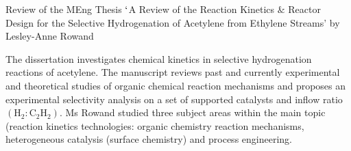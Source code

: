 \documentclass[14pt,twoside]{report}
\begin{document}
\clearpage





\bigskip

\begin{center}
  {\Large Review of the MEng Thesis $\lq$A Review of the Reaction Kinetics $\&$ Reactor Design for the Selective Hydrogenation of Acetylene from Ethylene Streams' by Lesley-Anne Rowand}
\end{center}

\medskip

The dissertation investigates chemical kinetics in selective hydrogenation reactions of acetylene. The manuscript reviews past and currently experimental and theoretical studies of organic chemical reaction mechanisms and proposes an experimental selectivity analysis on a set of supported catalysts and inflow ratio $\left(\text{H}_{2}:\text{C}_{2}\text{H}_{2}\right)$. Ms Rowand studied three subject areas within the main topic (reaction kinetics technologies: organic chemistry reaction mechanisms, heterogeneous catalysis (surface chemistry) and process engineering.
\end{document}
